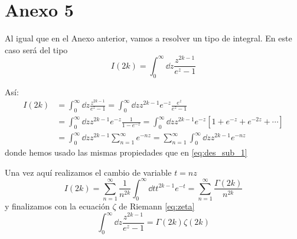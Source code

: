 \newpage
\section*{Anexo 5}\label{Anx5}
\renewcommand{\theequation}{A\textsubscript{5}.\arabic{equation}}
\setcounter{equation}{0}

Al igual que en el Anexo anterior, vamos a resolver un tipo de integral. En este caso será del tipo
\begin{equation}
	I(2k) = \int_{0}^{\infty} \dd{z} \frac{z^{2k-1}}{e^z-1}
\end{equation}

Así:
\begin{align}
	I(2k) &= \int_{0}^{\infty} \dd{z} \frac{z^{2k-1}}{e^z-1} = \int_{0}^{\infty} \dd{z} z^{2k-1} e^{-z}\frac{e^z}{e^z-1} \nonumber \\
		&= \int_{0}^{\infty} \dd{z} z^{2k-1} e^{-z}\frac{1}{1 - e^{-z}} = \int_{0}^{\infty} \dd{z} z^{2k-1} e^{-z} \left[1 + e^{-z} + e^{-2z} + \cdots \right] \\
		&= \int_{0}^{\infty} \dd{z} z^{2k-1} \sum_{n=1}^{\infty} e^{-nz} = \sum_{n=1}^{\infty}  \int_{0}^{\infty} \dd{z} z^{2k-1} e^{-nz}  \nonumber
\end{align}
donde hemos usado las mismas propiedades que en \eqref{eq:des_sub_1}

Una vez aquí realizamos el cambio de variable $t=nz$
\begin{equation}
	I(2k) = \sum_{n=1}^{\infty} \frac{1}{n^{2k}} \int_{0}^{\infty} \dd{t} t^{2k-1} e^{-t} = \sum_{n=1}^{\infty} \frac{\Gamma(2k)}{n^{2k}}
\end{equation}
y finalizamos con la ecuación $\zeta$ de Riemann \eqref{eq:zeta}
\begin{equation}
	\int_{0}^{\infty} \dd{z} \frac{z^{2k-1}}{e^z-1} = \Gamma(2k)\zeta(2k)
\end{equation}




